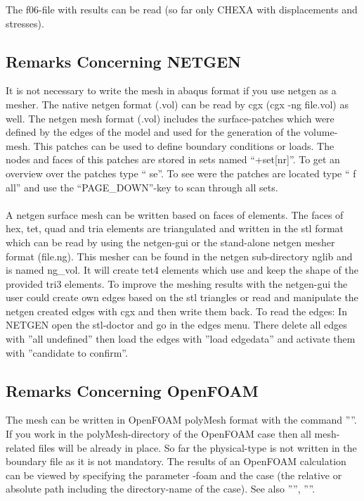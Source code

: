 \documentclass{article}
\begin{document}
\begin{appendix}
The f06-file with results can be read (so far only CHEXA with displacements and stresses).

\subsection{\label{Remarks Concerning NETGEN}Remarks Concerning NETGEN}
It is not necessary to write the mesh in abaqus format if you use netgen as a mesher. The native netgen format (.vol) can be read by cgx (cgx -ng file.vol) as well. The netgen mesh format (.vol) includes the surface-patches which were defined by the edges of the model and used for the generation of the volume-mesh. This patches can be used to define boundary conditions or loads. The nodes and faces of this patches are stored in sets named ``+set[nr]''. To get an overview over the patches type `` se''. To see were the patches are located type `` f all'' and use the ``PAGE\_DOWN''-key to scan through all sets.\\\\
A netgen surface mesh can be written based on faces of elements. The faces of hex, tet, quad and tria elements are triangulated and written in the stl format which can be read by using the netgen-gui or the stand-alone netgen mesher format (file.ng). This mesher can be found in the netgen sub-directory nglib and is named ng\_vol. It will create tet4 elements which use and keep the shape of the provided tri3 elements. To improve the meshing results with the netgen-gui the user could create own edges based on the stl triangles or read and manipulate the netgen created edges with cgx and then write them back. To read the edges: In NETGEN open the stl-doctor and go in the edges menu. There delete all edges with ''all undefined'' then load the edges with ''load edgedata'' and activate them with ''candidate to confirm''.

\subsection{\label{Remarks Concerning OpenFOAM}Remarks Concerning OpenFOAM}
The mesh can be written in OpenFOAM polyMesh format with the command ''''. If you work in the polyMesh-directory of the OpenFOAM case then all mesh-related files will be already in place. So far the physical-type is not written in the boundary file as it is not mandatory. The results of an OpenFOAM calculation can be viewed by specifying the parameter -foam and the case (the relative or absolute path including the directory-name of the case). See also '''', ''''.


\end{appendix}
\end{document}
